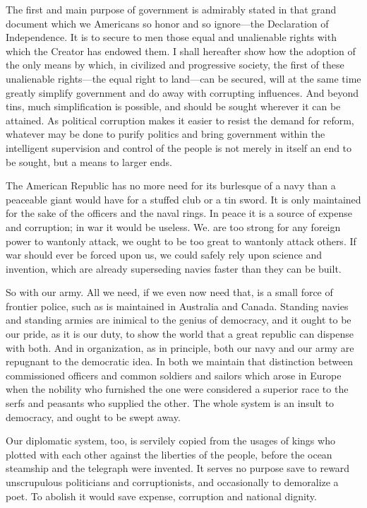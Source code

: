 \documentclass{book}
\begin{document}
The first and main purpose of government is admirably stated in that grand document which we Americans so honor and so ignore—the Declaration of Independence. It is to secure to men those equal and unalienable rights with which the Creator has endowed them. I shall hereafter show how the adoption of the only means by which, in civilized and progressive society, the first of these unalienable rights—the equal right to land—can be secured, will at the same time greatly simplify government and do away with corrupting influences. And beyond tins, much simplification is possible, and should be sought wherever it can be attained. As political corruption makes it easier to resist the demand for reform, whatever may be done to purify politics and bring government within the intelligent supervision and control of the people is not merely in itself an end to be sought, but a means to larger ends.

The American Republic has no more need for its burlesque of a navy than a peaceable giant would have for a stuffed club or a tin sword. It is only maintained for the sake of the officers and the naval rings. In peace it is a source of expense and corruption; in war it would be useless. We. are too strong for any foreign power to wantonly attack, we ought to be too great to wantonly attack others. If war should ever be forced upon us, we could safely rely upon science and invention, which are already superseding navies faster than they can be built.

So with our army. All we need, if we even now need that, is a small force of frontier police, such as is maintained in Australia and Canada. Standing navies and standing armies are inimical to the genius of democracy, and it ought to be our pride, as it is our duty, to show the world that a great republic can dispense with both. And in organization, as in principle, both our navy and our army are repugnant to the democratic idea. In both we maintain that distinction between commissioned officers and common soldiers and sailors which arose in Europe when the nobility who furnished the one were considered a superior race to the serfs and peasants who supplied the other. The whole system is an insult to democracy, and ought to be swept away.

Our diplomatic system, too, is servilely copied from the usages of kings who plotted with each other against the liberties of the people, before the ocean steamship and the telegraph were invented. It serves no purpose save to reward unscrupulous politicians and corruptionists, and occasionally to demoralize a poet. To abolish it would save expense, corruption and national dignity.
\end{document}
